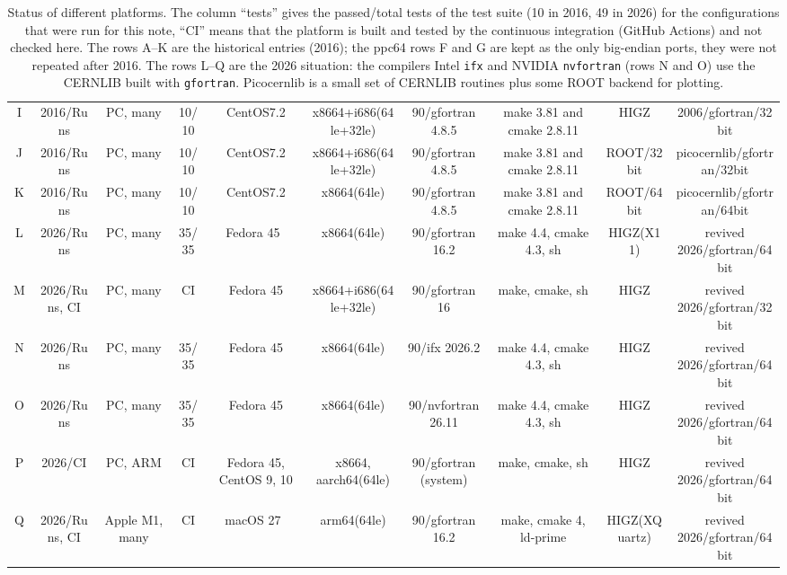 \begin{table}
{\begin{tabular}{|c|c|c|c|c|c|c|c|c|c|}
I   & 2016/Runs         &  PC, many                   &10/10   &CentOS7.2 & x8664+i686(64le+32le)   & 90/gfortran 4.8.5         &make 3.81 and cmake 2.8.11      &HIGZ      & 2006/gfortran/32bit     \\
J   & 2016/Runs         &  PC, many                   &10/10   &CentOS7.2 & x8664+i686(64le+32le)   & 90/gfortran 4.8.5         &make 3.81 and cmake 2.8.11      &ROOT/32bit& picocernlib/gfortran/32bit     \\
K   & 2016/Runs         &  PC, many                   &10/10   &CentOS7.2 & x8664(64le)             & 90/gfortran 4.8.5         &make 3.81 and cmake 2.8.11      &ROOT/64bit& picocernlib/gfortran/64bit\\\hline\hline
L   & 2026/Runs         &  PC, many                   &35/35   &Fedora 45~\cite{Wiki:Fedora} & x8664(64le)             & 90/gfortran 16.2          &make 4.4, cmake 4.3, sh       &HIGZ(X11)      & revived 2026/gfortran/64bit     \\
M   & 2026/Runs, CI     &  PC, many                   &CI      &Fedora 45 & x8664+i686(64le+32le)   & 90/gfortran 16            &make, cmake, sh       &HIGZ      & revived 2026/gfortran/32bit     \\
N   & 2026/Runs         &  PC, many                   &35/35   &Fedora 45 & x8664(64le)             & 90/ifx 2026.2             &make 4.4, cmake 4.3, sh       &HIGZ      & revived 2026/gfortran/64bit     \\
O   & 2026/Runs         &  PC, many                   &35/35   &Fedora 45 & x8664(64le)             & 90/nvfortran 26.11        &make 4.4, cmake 4.3, sh       &HIGZ      & revived 2026/gfortran/64bit     \\
P   & 2026/CI           &  PC, ARM                    &CI      &Fedora 45, CentOS 9, 10 & x8664, aarch64(64le) & 90/gfortran (system)  &make, cmake, sh       &HIGZ      & revived 2026/gfortran/64bit     \\
Q   & 2026/Runs, CI     &  Apple M1, many             &CI      &macOS 27~\cite{Wiki:macOS} & arm64(64le)         & 90/gfortran 16.2          &make, cmake 4, ld-prime       &HIGZ(XQuartz)  & revived 2026/gfortran/64bit     \\
\hline
\end{tabular}}
\caption{Status of different platforms. The column ``tests'' gives the passed/total tests of the test suite (10 in 2016, 49 in 2026) for the configurations that were run for this note, ``CI'' means that the platform is built and tested by the continuous integration (GitHub Actions) and not checked here. The rows A--K are the historical entries (2016); the ppc64 rows F and G are kept as the only big-endian ports, they were not repeated after 2016. The rows L--Q are the 2026 situation: the compilers Intel \texttt{ifx} and NVIDIA \texttt{nvfortran} (rows N and O) use the CERNLIB built with \texttt{gfortran}. Picocernlib is a small set of CERNLIB routines plus some ROOT backend for plotting. }
\label{tab:status}
\end{table}


